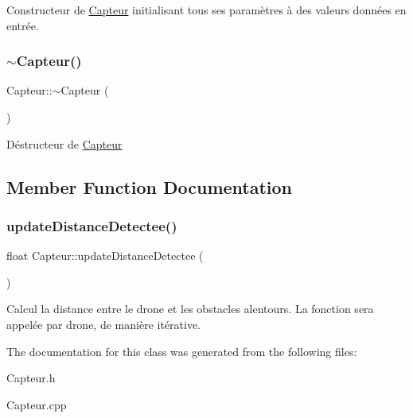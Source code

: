 Constructeur de \mbox{\hyperlink{class_capteur}{Capteur}} initialisant tous ses paramètres à des valeurs données en entrée. \mbox{\label{class_capteur_a2bbfecdceba5e9a13fc7c55cc5f7eae3}} 
\subsubsection{\texorpdfstring{$\sim$\+Capteur()}{~Capteur()}}
{\footnotesize\ttfamily Capteur\+::$\sim$\+Capteur (\begin{DoxyParamCaption}{ }\end{DoxyParamCaption})\hspace{0.3cm}{\ttfamily [virtual]}}

Déstructeur de \mbox{\hyperlink{class_capteur}{Capteur}} 

\subsection{Member Function Documentation}
\mbox{\label{class_capteur_ad44e85330ca70484a928c9f89ecf9c0a}} 
\subsubsection{\texorpdfstring{update\+Distance\+Detectee()}{updateDistanceDetectee()}}
{\footnotesize\ttfamily float Capteur\+::update\+Distance\+Detectee (\begin{DoxyParamCaption}{ }\end{DoxyParamCaption})}

Calcul la distance entre le drone et les obstacles alentours. La fonction sera appelée par drone, de manière itérative. 

The documentation for this class was generated from the following files\+:\begin{DoxyCompactItemize}
\item 
Capteur.\+h\item 
Capteur.\+cpp\end{DoxyCompactItemize}
